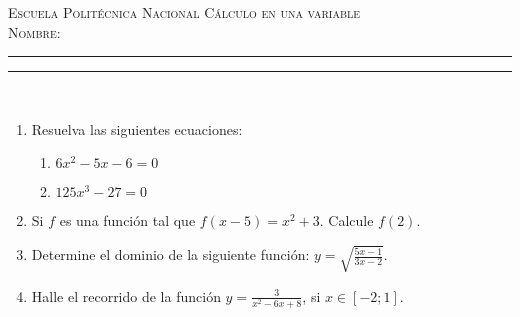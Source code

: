 \documentclass[11pt,a4paper,oneside]{article}\usepackage[]{graphicx}\usepackage[]{color}
\begin{document}
\thispagestyle{empty}
{\sf
{\Large \scshape Escuela Polit\'{e}cnica Nacional} \hfill {\scshape C\'{a}lculo en una variable}\\[7mm]
{\scshape Nombre:} \rule{0.6\textwidth}{0.5pt} \rule{0.1\textwidth}{0.5pt}\\
}











\begin{enumerate}
      \item Resuelva las siguientes ecuaciones:
\begin{enumerate}
  \item $6x^2 -5x-6=0$\\[15mm]
  \item $125x^3 -27=0$\\[15mm]
\end{enumerate}
      
      \item Si $f$ es una funci\'{o}n tal que $f(x-5)=x^2+3$. Calcule $f(2)$.\\[25mm]
      
      \item Determine el dominio de la siguiente funci\'{o}n: $y=\sqrt{\displaystyle\frac{5x-1}{3x-2}}$.\\[45mm]
      
      \item Halle el recorrido de la funci\'{o}n $y=\displaystyle\frac{3}{x^2-6x+8}$, si $x\in [-2; 1]$.\\[40mm]
      

\end{enumerate}
\end{document}
